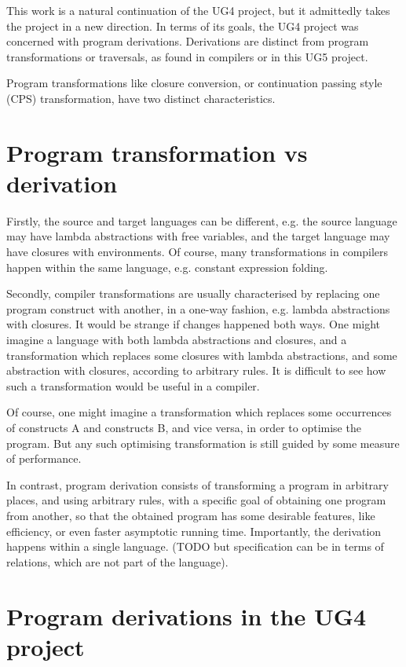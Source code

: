 \documentclass[bsc,frontabs,twoside,singlespacing,parskip,deptreport]{infthesis}
\theoremstyle{definition}
\begin{document}
This work is a natural continuation of the UG4 project, but it
admittedly takes the project in a new direction. In terms of its
goals, the UG4 project was concerned with program
derivations. Derivations are distinct from program transformations or
traversals, as found in compilers or in this UG5 project.

Program transformations like closure conversion, or continuation
passing style (CPS) transformation, have two distinct characteristics.

\section{Program transformation vs derivation}
\label{sec:progr-transf-vs}

Firstly, the source and target languages can be different, e.g. the
source language may have lambda abstractions with free variables, and
the target language may have closures with environments. Of course,
many transformations in compilers happen within the same language,
e.g. constant expression folding.

Secondly, compiler transformations are usually characterised by
replacing one program construct with another, in a one-way fashion,
e.g. lambda abstractions with closures. It would be strange if changes
happened both ways. One might imagine a language with both lambda
abstractions and closures, and a transformation which replaces some
closures with lambda abstractions, and some abstraction with closures,
according to arbitrary rules. It is difficult to see how such a
transformation would be useful in a compiler.

Of course, one might imagine a transformation which replaces some
occurrences of constructs A and constructs B, and vice versa, in order
to optimise the program. But any such optimising transformation is
still guided by some measure of performance.

In contrast, program derivation consists of transforming a program in
arbitrary places, and using arbitrary rules, with a specific goal of
obtaining one program from another, so that the obtained program has
some desirable features, like efficiency, or even faster asymptotic
running time. Importantly, the derivation happens within a single
language. (TODO but specification can be in terms of relations, which
are not part of the language).

\section{Program derivations in the UG4 project}
\label{sec:progr-deriv-ug4}
\end{document}
